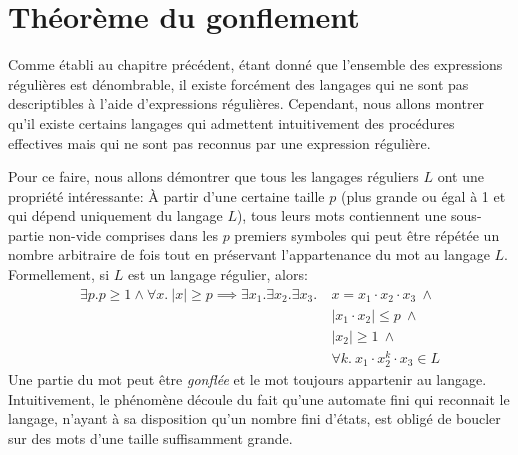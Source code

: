 \section{Théorème du gonflement}

Comme établi au chapitre précédent, étant donné que l'ensemble des expressions régulières est dénombrable, il existe forcément des langages qui ne sont pas descriptibles à l'aide d'expressions régulières.
Cependant, nous allons montrer qu'il existe certains langages qui admettent intuitivement des procédures effectives mais qui ne sont pas reconnus par une expression régulière.

Pour ce faire, nous allons démontrer que tous les langages réguliers $L$ ont une propriété intéressante:
À partir d'une certaine taille $p$ (plus grande ou égal à 1 et qui dépend uniquement du langage $L$), tous leurs mots contiennent une sous-partie non-vide comprises dans les $p$ premiers symboles qui peut être répétée un nombre arbitraire de fois tout en préservant l'appartenance du mot au langage $L$. Formellement, si $L$ est un langage régulier, alors:
\begin{align*}
\exists p. p \geq 1 \wedge \forall x.\ |x| \geq p \implies \exists x_1. \exists x_2. \exists x_3.\ &x = x_1 \cdot x_2 \cdot x_3\ \wedge\\
&|x_1 \cdot x_2| \leq p\ \wedge\\
&|x_2| \geq 1\ \wedge\\
&\forall k.\ x_1 \cdot x_2^k \cdot x_3 \in L
\end{align*}
Une partie du mot peut être \textit{gonflée} et le mot toujours appartenir au langage.
Intuitivement, le phénomène découle du fait qu'une automate fini qui reconnait le langage, n'ayant à sa disposition qu'un nombre fini d'états, est obligé de boucler sur des mots d'une taille suffisamment grande.


